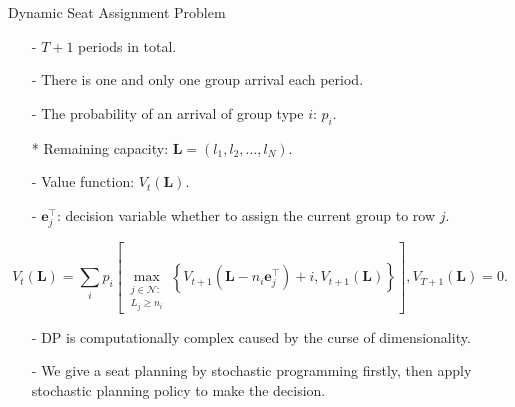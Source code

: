   \begin{frame}{Dynamic Seat Assignment Problem}
    \centering
    \small
    \begin{itemize}
    \item[-] $T+1$ periods in total.
    \item[-] There is one and only one group arrival each period. 
    \item[-] The probability of an arrival of group type $i$: $p_i$.  
    \item[*] Remaining capacity: $\mathbf{L} = (l_1, l_2, \ldots, l_{N})$.
    \item[-] Value function: $V_{t}(\mathbf{L})$.
    \item[-] $\mathbf{e}_j^{\intercal}$: decision variable whether to assign the current group to row $j$.
    \end{itemize}

    $$V_{t}(\mathbf{L}) = \sum_{i} p_i \left[\max_{\substack{j \in \mathcal{N}: \\ L_j \geqslant {n}_{i}}}\left\{V_{t+1}\left(\mathbf{L}- n_{i}\mathbf{e}_j^{\intercal} \right)+ i, V_{t+1}(\mathbf{L})\right\}\right], V_{T+1}(\mathbf{L}) = 0.$$
    \small
    \begin{itemize}
      \item[-] DP is computationally complex caused by the curse of dimensionality.
      \item[-] We give a seat planning by stochastic programming firstly, then apply stochastic planning policy to make the decision.
    \end{itemize}
\end{frame}